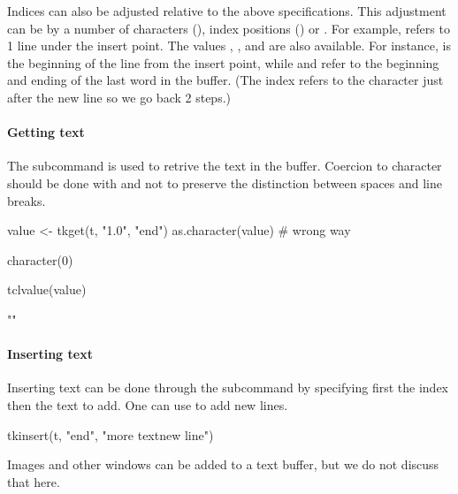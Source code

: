Indices can also be adjusted relative to the above
specifications. This adjustment can be by a number of characters
(), index positions () or . For
example,  refers to 1 line under the insert
point. The values , , 
and  are also available. For instance,  is the beginning of the line from the insert point, while
 and  refer to the
beginning and ending of the last word in the buffer. (The 
index refers to the character just after the new line so we go back 2
steps.)

\paragraph{Getting text}
The  subcommand is used to retrive the text in the buffer. Coercion to character should be done with  and not  to preserve the distinction between spaces and line breaks.

\begin{Schunk}
\begin{Sinput}
 value <- tkget(t, "1.0", "end")
 as.character(value)                     # wrong way
\end{Sinput}
\begin{Soutput}
character(0)
\end{Soutput}
\begin{Sinput}
 tclvalue(value)
\end{Sinput}
\begin{Soutput}
[1] "\n"
\end{Soutput}
\end{Schunk}

\paragraph{Inserting text}
Inserting text can be done through the 
subcommand by specifying first the index then the text to add. One can use  to add new lines.
\begin{Schunk}
\begin{Sinput}
 tkinsert(t, "end", "more text\n new line")  
\end{Sinput}
\end{Schunk}
Images and other windows can be added to a text buffer, but we do not discuss that here.

